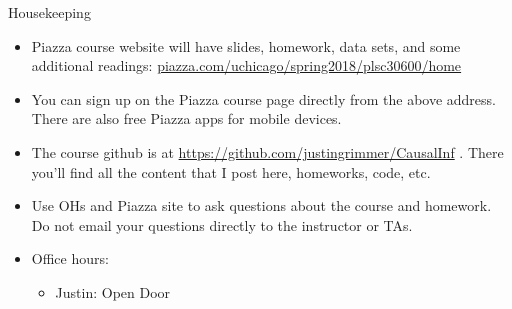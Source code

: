\documentclass{beamer}
\numberwithin{equation}{section}
\begin{document}
\begin{frame}{Housekeeping}
\small

\begin{itemize}
\item Piazza course website will have slides, homework, data sets, and some additional readings: \url{piazza.com/uchicago/spring2018/plsc30600/home}  \bigskip
\item You can sign up on the Piazza course page directly from the above address. There are also free Piazza apps for mobile devices. \bigskip

\item The course github is at \url{https://github.com/justingrimmer/CausalInf} .  There you'll find all the content that I post here, homeworks, code, etc.  

\item \alert{Use OHs and Piazza site to ask questions about the course and homework. Do not email your questions directly to the instructor or TAs.}\bigskip

\item   Office hours:

  \begin{itemize}
   \item Justin: Open Door
  \end{itemize}

\end{itemize}

\end{frame}
\end{document}
